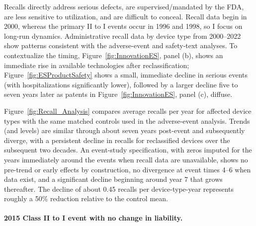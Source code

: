 \documentclass[letterpaper,12pt]{article}
\theoremstyle{definition}
\begin{document}
Recalls directly address serious defects, are supervised/mandated by the FDA, are less sensitive to utilization, and are difficult to conceal. Recall data begin in 2000, whereas the primary II to I events occur in 1996 and 1998, so I focus on long-run dynamics. Administrative recall data by device type from 2000–2022 show patterns consistent with the adverse-event and safety‐text analyses. To contextualize the timing, Figure~\ref{fig:InnovationES}, panel (b), shows an immediate rise in available technologies after reclassification; Figure~\ref{fig:ESProductSafety} shows a small, immediate decline in serious events (with hospitalizations significantly lower), followed by a larger decline five to seven years later as patents in Figure~\ref{fig:InnovationES}, panel (c), diffuse.


Figure~\ref{fig:Recall_Analysis} compares average recalls per year for affected device types with the same matched controls used in the adverse-event analysis. Trends (and levels) are similar through about seven years post-event and subsequently diverge, with a persistent decline in recalls for reclassified devices over the subsequent two decades. An event-study specification, with zeros imputed for the years immediately around the events when recall data are unavailable, shows no pre-trend or early effects by construction, no divergence at event times 4–6 when data exist, and a significant decline beginning around year 7 that grows thereafter. The decline of about 0.45 recalls per device-type-year represents roughly a 50\% reduction relative to the control mean.

\paragraph{2015 Class II to I event with no change in liability.}\label{sec:Placebo}
\end{document}
